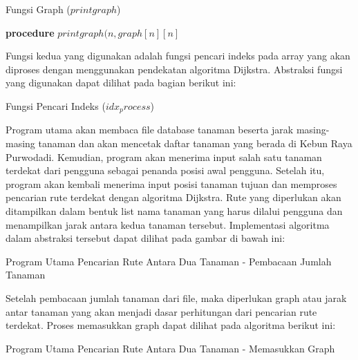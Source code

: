 \documentclass[conference]{IEEEtran}
\begin{document}
\begin{algorithm}
	\caption{Fungsi Graph ($printgraph$)}
	\SetAlgoLined
	\DontPrintSemicolon

	\textbf{procedure} \textit {$printgraph(n, graph[n][n]$}\\
	
\end{algorithm}

Fungsi kedua yang digunakan adalah fungsi pencari indeks
pada array yang akan diproses dengan menggunakan pendekatan
algoritma Dijkstra. Abstraksi fungsi yang digunakan
dapat dilihat pada bagian berikut ini:

\begin{algorithm}
	\caption{Fungsi Pencari Indeks ($idx_process$)}
	\SetAlgoLined
	\DontPrintSemicolon

\end{algorithm}

Program utama akan membaca file database tanaman
beserta jarak masing-masing tanaman dan akan mencetak
daftar tanaman yang berada di Kebun Raya Purwodadi.
Kemudian, program akan menerima input salah satu tanaman
terdekat dari pengguna sebagai penanda posisi awal pengguna.
Setelah itu, program akan kembali menerima input posisi
tanaman tujuan dan memproses pencarian rute terdekat dengan
algoritma Dijkstra. Rute yang diperlukan akan ditampilkan
dalam bentuk list nama tanaman yang harus dilalui pengguna
dan menampilkan jarak antara kedua tanaman tersebut.
Implementasi algoritma dalam abstraksi tersebut dapat dilihat
pada gambar di bawah ini:

\begin{algorithm}
	\caption{Program Utama Pencarian Rute Antara Dua Tanaman - Pembacaan Jumlah Tanaman}
	\SetAlgoLined
	\DontPrintSemicolon

\end{algorithm}

Setelah pembacaan jumlah tanaman dari file, maka diperlukan
graph atau jarak antar tanaman yang akan menjadi dasar
perhitungan dari pencarian rute terdekat. Proses memasukkan
graph dapat dilihat pada algoritma berikut ini:

\begin{algorithm}
	\caption{Program Utama Pencarian Rute Antara
			Dua Tanaman - Memasukkan Graph}
	\SetAlgoLined
	\DontPrintSemicolon

\end{algorithm}
\end{document}
